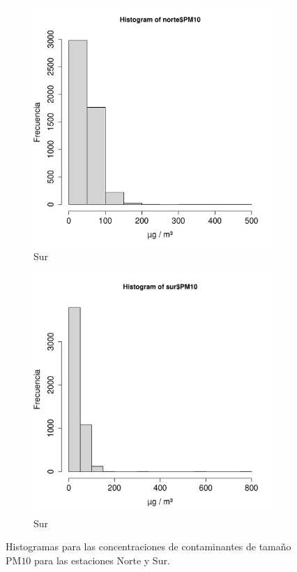 \documentclass[paper=leter, fontsize=11pt]{scrartcl}
\numberwithin{equation}{section}		%
\numberwithin{figure}{section}			%
\numberwithin{table}{section}				%
\begin{document}
\begin{figure}
    \begin{subfigure}{.5\textwidth}
        \centering
        \includegraphics[scale=0.4]{norte_hist.pdf}
        \caption{Sur}
        \label{norte_hist}
    \end{subfigure}
    \begin{subfigure}{0.5\textwidth}
        \centering
        \includegraphics[scale=0.4]{sur_hist.pdf}
        \caption{Sur}
        \label{sur_hist}
    \end{subfigure}
    \caption{Histogramas para las concentraciones de contaminantes de tamaño PM$10$ para las estaciones Norte y Sur.}
    \label{hist}
\end{figure}
\end{document}

